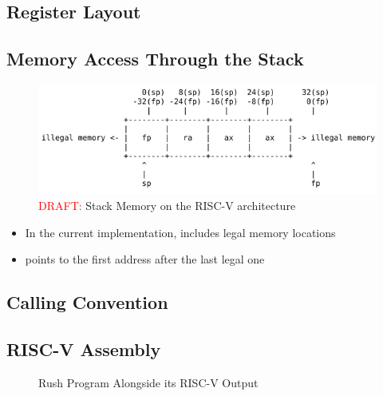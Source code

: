\subsection{Register Layout}

\subsection{Memory Access Through the Stack}

\begin{figure}[h]
	\includegraphics[width=\textwidth]{./riscv_stack_draft.png}
	\caption{\textcolor{red}{DRAFT:} Stack Memory on the RISC-V architecture}\label{fig:riscv_stack}
\end{figure}

\begin{itemize}
	\item In the current implementation,  includes legal memory locations
	\item {} points to the first address after the last legal one
\end{itemize}

\subsection{Calling Convention}

\subsection{RISC-V Assembly}

\noindent
\begin{figure}[h]
	\begin{minipage}{.4\textwidth}
	\end{minipage}%
	\begin{minipage}{.6\textwidth}
	\end{minipage}
	\caption{Rush Program Alongside its RISC-V Output}\label{fig:rush_riscv_split}
\end{figure}

